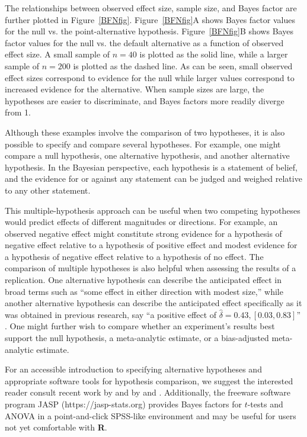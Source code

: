 \documentclass[man]{apa6}
\begin{document}
The relationships between observed effect size, sample size, and Bayes factor are further plotted in Figure~\ref{BFNfig}. Figure~\ref{BFNfig}A shows Bayes factor values for the null vs. the point-alternative hypothesis. Figure~\ref{BFNfig}B shows Bayes factor values for the null vs. the default alternative as a function of observed effect size. A small sample of $n=40$ is plotted as the solid line, while a larger sample of $n=200$ is plotted as the dashed line. As can be seen, small observed effect sizes correspond to evidence for the null while larger values correspond to increased evidence for the alternative. When sample sizes are large, the hypotheses are easier to discriminate, and Bayes factors more readily diverge from 1.  

Although these examples involve the comparison of two hypotheses, it is also possible to specify and compare several hypotheses. For example, one might compare a null hypothesis, one alternative hypothesis, and another alternative hypothesis. In the Bayesian perspective, each hypothesis is a statement of belief, and the evidence for or against any statement can be judged and weighed relative to any other statement. 

This multiple-hypothesis approach can be useful when two competing hypotheses would predict effects of different magnitudes or directions. For example, an observed negative effect might constitute strong evidence for a hypothesis of negative effect relative to a hypothesis of positive effect and modest evidence for a hypothesis of negative effect relative to a hypothesis of no effect. The comparison of multiple hypotheses is also helpful when assessing the results of a replication. One alternative hypothesis can describe the anticipated effect in broad terms such as ``some effect in either direction with modest size,'' while another alternative hypothesis can describe the anticipated effect specifically as it was obtained in previous research, say ``a positive effect of $\hat{\delta} = 0.43, [0.03, 0.83]$'' \citep[see][for an example]{Boekel:etal:2014}. 
One might further wish to compare whether an experiment's results best support the null hypothesis, a meta-analytic estimate, or a bias-adjusted meta-analytic estimate.  

For an accessible introduction to specifying alternative hypotheses and appropriate software tools for hypothesis comparison, we suggest the interested reader consult recent work by \citet{Dienes:2011,Dienes:2014} and by \citet{Rouder:Morey:2012} and \citet{Rouder:etal:2012}. Additionally, the freeware software program JASP (https://jasp-stats.org) provides Bayes factors for $t$-tests and ANOVA in a point-and-click SPSS-like environment and may be useful for users not yet comfortable with {\bf R}. 
\end{document}

